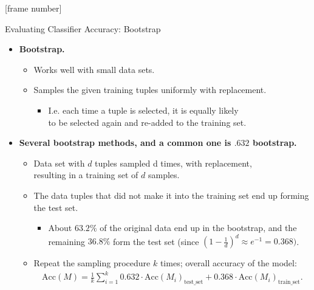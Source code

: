 \documentclass[aspectratio=169,t,table]{beamer}
\begin{document}
  {
    [frame number]
    \begin{frame}{Evaluating Classifier Accuracy: Bootstrap}
      \begin{itemize}
        \item \textbf{Bootstrap.}
        \begin{itemize}
          \item Works well with small data sets.
          \item Samples the given training tuples uniformly with replacement.
          \begin{itemize}
            \item I.e. each time a tuple is selected, it is equally likely \\
            to be selected again and re-added to the training set.
          \end{itemize}
        \end{itemize}
        \item \textbf{Several bootstrap methods, and a common one is $.632$ bootstrap.}
        \begin{itemize}
          \item Data set with $d$ tuples sampled d times, with replacement, \\
          resulting in a training set of $d$ samples.
          \item The data tuples that did not make it into the training set end up forming the test set.
          \begin{itemize}
            \item About $63.2\%$ of the original data end up in the bootstrap, and the remaining $36.8\%$ form the test set (since $(1-\frac{1}{d})^d \approx e^{-1} = 0.368)$.
          \end{itemize}
          \item Repeat the sampling procedure $k$ times; overall accuracy of the model:
          \begin{align}
            \text{Acc}(M) = \frac{1}{k} \sum_{i=1}^{k} 0.632 \cdot \text{Acc}(M_i)_{\text{test\_set}} + 0.368 \cdot \text{Acc}(M_i)_{\text{train\_set}}.
          \end{align}
        \end{itemize}
      \end{itemize}
    \end{frame}
  }
\end{document}
